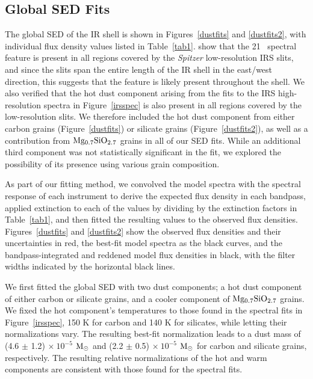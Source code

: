 \documentclass{emulateapj}
\newcommand{\spitzer}{\textit{Spitzer }}
\begin{document}





\subsection{Global SED Fits}\label{globalfit}

The global SED of the IR shell is shown in Figures~\ref{dustfits} and \ref{dustfits2}, with individual flux density values listed in Table~\ref{tab1}. \citet{temim10} show that the 21 \micron\ spectral feature is present in all regions covered by the \spitzer low-resolution IRS slits, and since the slits span the entire length of the IR shell in the east/west direction, this suggests that the feature is likely present throughout the shell. We also verified that the hot dust component arising from the fits to the IRS high-resolution spectra in Figure~\ref{irsspec} is also present in all regions covered by the low-resolution slits.
We therefore included the hot dust component from either carbon grains (Figure~\ref{dustfits}) or silicate grains (Figure~\ref{dustfits2}), as well as a contribution from $\rm Mg_{0.7}SiO_{2.7}$ grains in all of our SED fits. While an additional third component was not statistically significant in the fit, we explored the possibility of its presence using various grain composition.

As part of our fitting method, we convolved the model spectra with the spectral response of each instrument to derive the expected flux density in each bandpass, applied extinction to each of the values by dividing by the extinction factors in Table~\ref{tab1}, and then fitted the resulting values to the observed flux densities. Figures~\ref{dustfits} and \ref{dustfits2} show the observed flux densities and their uncertainties in red, the best-fit model spectra as the black curves, and the bandpass-integrated and reddened model flux densities in black, with the filter widths indicated by the horizontal black lines. 

We first fitted the global SED with two dust components; a hot dust component of either carbon or silicate grains, and a cooler component of $\rm Mg_{0.7}SiO_{2.7}$ grains. We fixed the hot component's temperatures to those found in the spectral fits in Figure~\ref{irsspec}, 150 K for carbon and 140 K for silicates, while letting their normalizations vary. The resulting best-fit normalization leads to a dust mass of (4.6 $\pm$ 1.2) $\times \: 10^{-5}$ $\rm M_{\odot}$ and (2.2 $\pm$ 0.5) $\times \: 10^{-5}$ $\rm M_{\odot}$ for carbon and silicate grains, respectively. The resulting relative normalizations of the hot and warm components are consistent with those found for the spectral fits.
\end{document}
